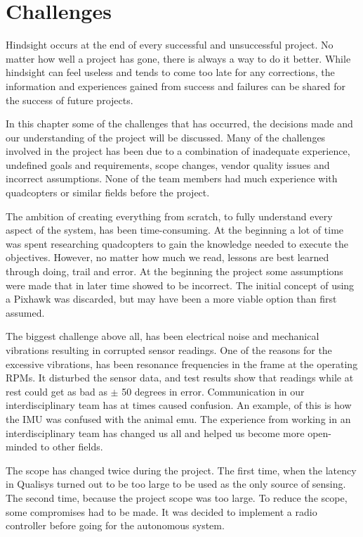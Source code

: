 \chapter{Challenges}
Hindsight occurs at the end of every successful and unsuccessful project. No matter how well a project has gone, there is always a way to do it better. While hindsight can feel useless and tends to come too late for any corrections, the information and experiences gained from success and failures can be shared for the success of future projects.\bigskip

In this chapter some of the challenges that has occurred, the decisions made and our understanding of the project will be discussed. Many of the challenges involved in the project has been due to a combination of inadequate experience, undefined goals and requirements, scope changes, vendor quality issues and incorrect assumptions. None of the team members had much experience with quadcopters or similar fields before the project. \bigskip

The ambition of creating everything from scratch, to fully understand every aspect of the system, has been time-consuming. At the beginning a lot of time was spent researching quadcopters to gain the knowledge needed to execute the objectives. However, no matter how much we read, lessons are best learned through doing, trail and error. At the beginning the project some assumptions were made that in later time showed to be incorrect. The initial concept of using a Pixhawk was discarded, but may have been a more viable option than first assumed.\bigskip

The biggest challenge above all, has been electrical noise and mechanical vibrations resulting in corrupted sensor readings. One of the reasons for the excessive vibrations, has been resonance frequencies in the frame at the operating RPMs. It disturbed the sensor data, and test results show that readings while at rest could get as bad as $\pm$ 50 degrees in error. Communication in our interdisciplinary team has at times caused confusion. An example, of this is how the IMU was confused with the animal emu. The experience from working in an interdisciplinary team has changed us all and helped us become more open-minded to other fields. \bigskip

The scope has changed twice during the project. The first time, when the latency in Qualisys turned out to be too large to be used as the only source of sensing. The second time, because the project scope was too large. To reduce the scope, some compromises had to be made. It was decided to implement a radio controller before going for the autonomous system.\bigskip

